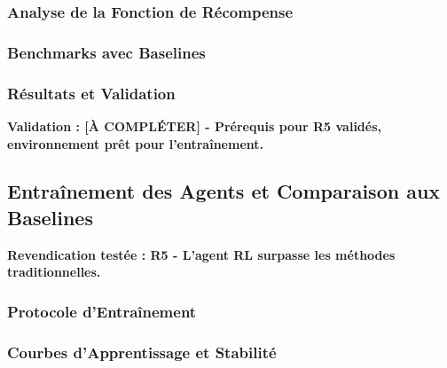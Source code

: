 \subsubsection{Analyse de la Fonction de Récompense}
\label{subsec:analyse_recompense}

\subsubsection{Benchmarks avec Baselines}
\label{subsec:benchmarks_baselines}

\subsubsection{Résultats et Validation}
\label{subsec:resultats_env_rl}

\textbf{Validation : [À COMPLÉTER] - Prérequis pour R5 validés, environnement prêt pour l'entraînement.}

\subsection{Entraînement des Agents et Comparaison aux Baselines}
\label{sec:entrainement_agents}

\textbf{Revendication testée : R5 - L'agent RL surpasse les méthodes traditionnelles.}

\subsubsection{Protocole d'Entraînement}
\label{subsec:protocole_entrainement}

\subsubsection{Courbes d'Apprentissage et Stabilité}
\label{subsec:courbes_apprentissage}

